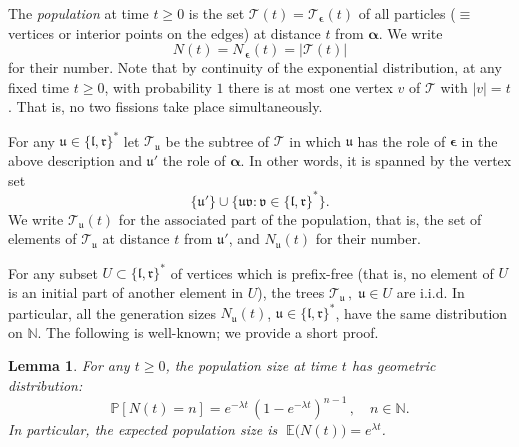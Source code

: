 \documentclass[12pt]{amsart}
\newcommand\bal{\boldsymbol{\alpha}}
\newcommand\bep{\boldsymbol{\epsilon}}
\newcommand\E{\mathbb E}
\newcommand\lt{\mathfrak{l}}
\newcommand\N{\mathbb N}
\newcommand\nn{N}
\newcommand\Prob{\mathbb P}
\newcommand\rt{\mathfrak{r}}
\newcommand\T{\mathcal T}
\newcommand\ut{\mathfrak{u}}
\newcommand\vt{\mathfrak{v}}
\numberwithin{theorem}{section}
\newtheorem{lem}[theorem]{Lemma}%
\theoremstyle{definition}
\begin{document}
The \emph{population} at time $t \ge 0$ is the set 
$\T(t) = \T_{\bep}(t)$ 
of all particles ($\equiv$ vertices or 
interior points on the edges) at distance $t$ from $\bal$. We write 
$$
\nn(t) = \nn_{\,\bep}(t) = |\T(t)|
$$
for their number. Note that by continuity of the exponential distribution, at any fixed time 
$t \ge 0$, with probability $1$ there is at most one vertex $v$ of $\T$ with $|v|=t$. 
That is, no two fissions take place simultaneously. %

For any $\ut \in \{\lt,\rt\}^*$ let $\T_{\ut}$ be the subtree of $\T$ in which $\ut$ has the 
role of $\bep$
in the above description and $\ut'$ the role of $\bal$. In other words, it is spanned  by
the vertex set 
$$
\{\ut'\} \cup \bigl\{ \ut\vt : \vt \in \{\lt,\rt\}^* \bigr\}. 
$$
We write $\T_{\ut}(t)$ for the associated part of the population, that is, the set of elements of 
$\T_{\ut}$ at distance $t$ from $\ut'$, and $\nn_{\ut}(t)$ for their number.

For any subset $U \subset \{\lt,\rt\}^*$ of vertices which is prefix-free (that is, no
element of $U$ is an initial part of another element in $U$),  the trees $\T_{\ut}\,,\; \ut \in U$
are i.i.d. In particular, all the generation sizes $\nn_{\ut}(t)$, $\ut \in \{\lt,\rt\}^*$,
have the same distribution %
on $\N$. The following is well-known; %
we provide a short proof.

\begin{lem}\label{lem:expected} For any $t \ge 0$, the population size at
time $t$ has geometric distribution:
$$
\Prob[\nn(t)=n] = e^{-\lambda t}\,(1- e^{-\lambda t})^{n-1}\,,\quad n \in \N.
$$
In particular, the expected population size is $\;\E\bigl(\nn(t)\bigr) = e^{\lambda t}$.
\end{lem}
\end{document}
